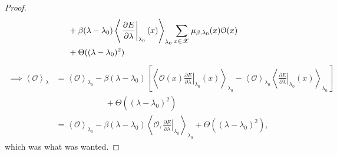 \documentclass[letterpaper,english,12pt]{article}
\begin{document}
\begin{proof}
\begin{align}
 &+ \beta (\lambda - \lambda_0) \left\langle \left. \frac{\partial E}{\partial \lambda} \right|_{\lambda_0}(x) \right\rangle_{\lambda_0} \sum_{x \in \mathscr{X}} \mu_{\beta,\lambda_0}(x) \mathcal{O}(x) \nonumber \\
 &+ \Theta((\lambda - \lambda_0)^2)
\end{align}
\begin{align}
\implies \left\langle \mathcal{O} \right\rangle_{\lambda} &= \left\langle \mathcal{O} \right\rangle_{\lambda_0} - \beta (\lambda - \lambda_0) \left[ \left\langle \mathcal{O}(x) \left. \frac{\partial E}{\partial \lambda} \right|_{\lambda_0}(x) \right\rangle_{\lambda_0} - \left\langle \mathcal{O} \right\rangle_{\lambda_0} \left\langle \left. \frac{\partial E}{\partial \lambda} \right|_{\lambda_0}(x) \right\rangle_{\lambda_0} \right] \nonumber \\
	& \qquad \qquad \qquad + \Theta((\lambda - \lambda_0)^2) \nonumber \\
	&= \left\langle \mathcal{O} \right\rangle_{\lambda_0} - \beta (\lambda - \lambda_0) \left\langle \mathcal{O}, \left. \frac{\partial E}{\partial \lambda} \right|_{\lambda_0} \right\rangle_{\lambda_0} + \Theta((\lambda - \lambda_0)^2),
\end{align}
which was what was wanted.
\end{proof}
\end{document}
